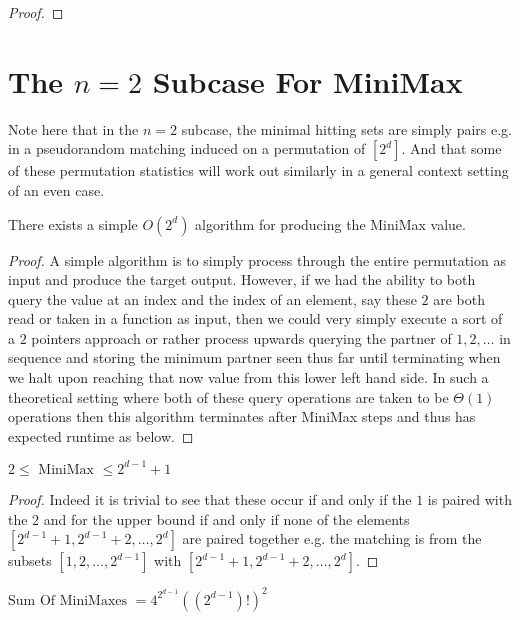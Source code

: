 \documentclass[12pt]{article}
\begin{document}
\begin{proof}
\end{proof}

\section{The $n = 2$ Subcase For MiniMax}

Note here that in the $n = 2$ subcase, the minimal hitting sets are simply pairs e.g. in a pseudorandom matching induced on a permutation of $[2^d]$. And that some of these permutation statistics will work out similarly in a general context setting of an even case.

\begin{theorem}\label{Thm:$n = 2$ MiniMax Algorithm}
	There exists a simple $O(2^d)$ algorithm for producing the MiniMax value.
\end{theorem}

\begin{proof}
	A simple algorithm is to simply process through the entire permutation as input and produce the target output. However, if we had the ability to both query the value at an index and the index of an element, say these $2$ are both read or taken in a function as input, then we could very simply execute a sort of a $2$ pointers approach or rather process upwards querying the partner of $1,2,\dots$ in sequence and storing the minimum partner seen thus far until terminating when we halt upon reaching that now value from this lower left hand side. In such a theoretical setting where both of these query operations are taken to be $\Theta(1)$ operations then this algorithm terminates after MiniMax steps and thus has expected runtime as below.
\end{proof}

\begin{theorem}\label{Thm:$n = 2$ MiniMax Bounds}
	$2 \le \text{ MiniMax } \le 2^{d-1}+1$
\end{theorem}

\begin{proof}
	Indeed it is trivial to see that these occur if and only if the $1$ is paired with the $2$ and for the upper bound if and only if none of the elements $[2^{d-1}+1,2^{d-1}+2,\dots,2^d]$ are paired together e.g. the matching is from the subsets $[1,2,\dots,2^{d-1}]$ with $[2^{d-1}+1,2^{d-1}+2,\dots,2^d]$.
\end{proof}

\begin{theorem}\label{Thm:$n = 2$ MiniMax Expected Value And Sum}
	$\text{Sum Of MiniMaxes } = 4^{2^{d-1}}((2^{d-1})!)^2$
\end{theorem}
\end{document}
